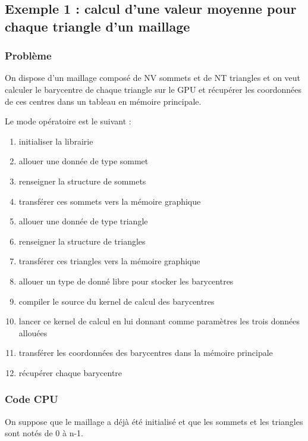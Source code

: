 \documentclass[a4paper,12pt]{article}
\begin{document}
\subsection{Exemple 1 : calcul d'une valeur moyenne pour chaque triangle d'un maillage}
\label{ex1}
\subsubsection{Problème}
On dispose d'un maillage composé de NV sommets et de NT triangles et on veut calculer le barycentre de chaque triangle sur le GPU et récupérer les coordonnées de ces centres dans un tableau en mémoire principale.

Le mode opératoire est le suivant :
\begin{enumerate}
\item initialiser la librairie
\item allouer une donnée de type sommet
\item renseigner la structure de sommets
\item transférer ces sommets vers la mémoire graphique
\item allouer une donnée de type triangle
\item renseigner la structure de triangles
\item transférer ces triangles vers la mémoire graphique
\item allouer un type de donné libre pour stocker les barycentres
\item compiler le source du kernel de calcul des barycentres
\item lancer ce kernel de calcul en lui donnant comme paramètres les trois données allouées
\item transférer les coordonnées des barycentres dans la mémoire principale
\item récupérer chaque barycentre
\end{enumerate}

\subsubsection{Code CPU}
On suppose que le maillage a déjà été initialisé et que les sommets et les triangles sont notés de 0 à n-1.
\end{document}

